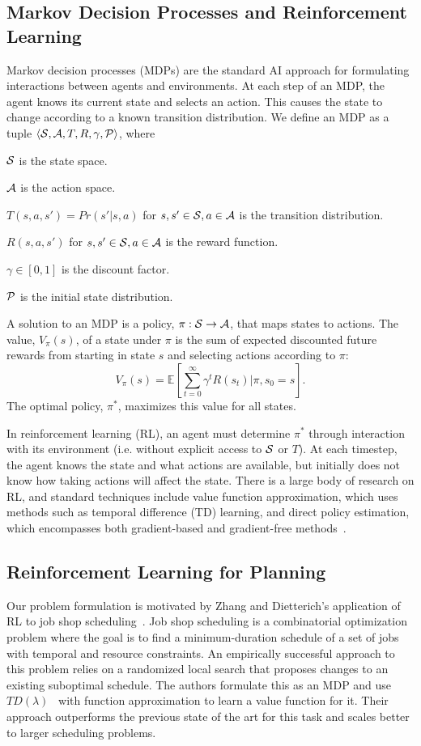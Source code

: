 \subsection{Markov Decision Processes and Reinforcement Learning}
Markov decision processes (MDPs) are the standard AI approach for formulating
interactions between agents and environments. At each step of an MDP,
the agent knows its current state and selects an action. This causes the
state to change according to a known transition distribution. We define
an MDP as a tuple $\langle \mathcal{S}, \mathcal{A}, T, R, \gamma, \mathcal{P} \rangle$, where
\begin{tightlist}
\item $\mathcal{S}$ is the state space.
\item $\mathcal{A}$ is the action space.
\item $T(s, a, s') = Pr(s' | s, a)$ for $s, s' \in \mathcal{S}, a \in \mathcal{A}$ is the transition distribution.
\item $R(s, a, s')$ for $s, s' \in \mathcal{S}, a \in \mathcal{A}$ is the reward function.
\item $\gamma \in [0, 1]$ is the discount factor.
\item $\mathcal{P}$ is the initial state distribution.
\end{tightlist}
A solution to an MDP is a policy, $\pi: \mathcal{S} \rightarrow \mathcal{A}$, that maps states to
actions. The value, $V_{\pi}(s)$, of a state under $\pi$ is the sum of expected
discounted future rewards from starting in state $s$ and selecting actions according
to $\pi$:
$$V_{\pi}(s) = \mathbb{E}[\sum_{t=0}^{\infty}\gamma^{t}R(s_{t}) | \pi, s_{0} = s].$$
The optimal policy, $\pi^{*}$, maximizes this value for all states.

In reinforcement learning (RL), an agent must determine $\pi^{*}$
through interaction with its environment (i.e. without explicit access
to $\mathcal{S}$ or $T$). At each timestep, the agent knows the state and what
actions are available, but initially does not know how taking actions will
affect the state. There is a large body of research on RL, and
standard techniques include value function approximation, which uses methods such as temporal difference
(TD) learning, and direct policy estimation, which encompasses both gradient-based
and gradient-free methods~\cite{suttonbarto}.

\subsection{Reinforcement Learning for Planning}
Our problem formulation is motivated by Zhang and Dietterich's application of RL to job
shop scheduling~\cite{JobShopSched}. Job shop scheduling is a combinatorial optimization problem where the goal is to find
a minimum-duration schedule of a set of jobs with temporal and resource constraints. An empirically
successful approach to this problem relies on a randomized local search that proposes changes to an
existing suboptimal schedule. The authors formulate this as an MDP and use $TD(\lambda)$~\cite{suttonbarto} with function
approximation to learn a value function for it. Their approach outperforms the previous state of the art for this task and
scales better to larger scheduling problems.

